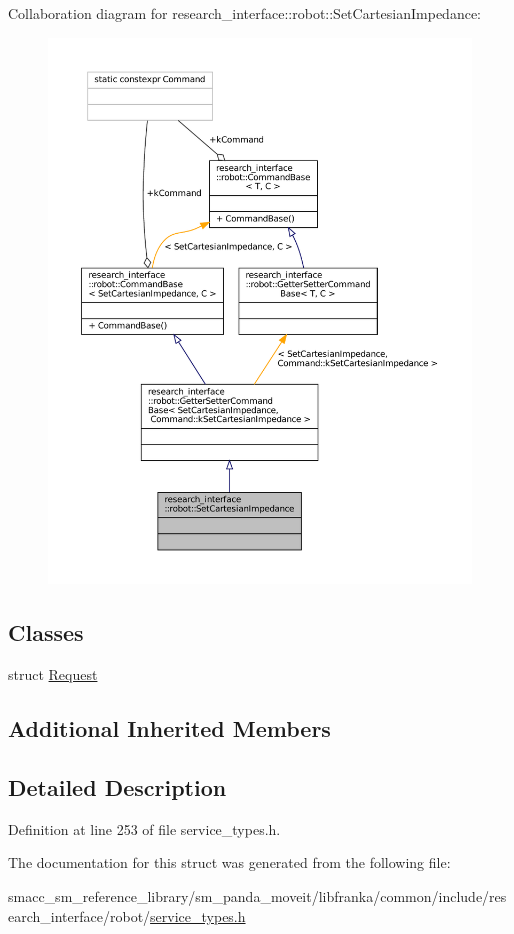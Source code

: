 Collaboration diagram for research\+\_\+interface\+:\+:robot\+:\+:Set\+Cartesian\+Impedance\+:
\nopagebreak
\begin{figure}[H]
\begin{center}
\leavevmode
\includegraphics[width=350pt]{structresearch__interface_1_1robot_1_1SetCartesianImpedance__coll__graph}
\end{center}
\end{figure}
\subsection*{Classes}
\begin{DoxyCompactItemize}
\item 
struct \hyperlink{structresearch__interface_1_1robot_1_1SetCartesianImpedance_1_1Request}{Request}
\end{DoxyCompactItemize}
\subsection*{Additional Inherited Members}


\subsection{Detailed Description}


Definition at line 253 of file service\+\_\+types.\+h.



The documentation for this struct was generated from the following file\+:\begin{DoxyCompactItemize}
\item 
smacc\+\_\+sm\+\_\+reference\+\_\+library/sm\+\_\+panda\+\_\+moveit/libfranka/common/include/research\+\_\+interface/robot/\hyperlink{service__types_8h}{service\+\_\+types.\+h}\end{DoxyCompactItemize}
